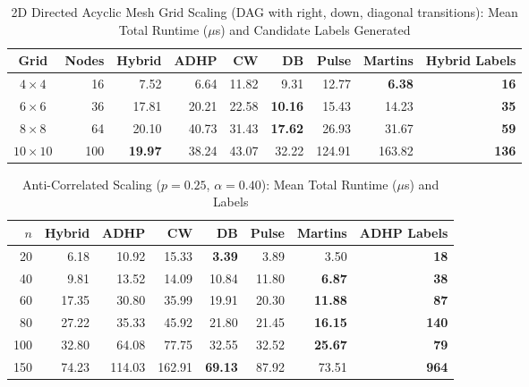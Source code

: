 \documentclass[11pt,a4paper]{article}
\begin{document}
\begin{table}[ht]
\centering
\small
\caption{2D Directed Acyclic Mesh Grid Scaling (DAG with right, down, diagonal transitions): Mean Total Runtime ($\mu$s) and Candidate Labels Generated}
\begin{tabular}{cr rrrrrr r}
\toprule
Grid & Nodes & \textbf{Hybrid} & ADHP & CW & DB & Pulse & Martins & \textbf{Hybrid Labels} \\
\midrule
$4 \times 4$   & 16  & 7.52 & 6.64 & 11.82 & 9.31 & 12.77 & \textbf{6.38} & \textbf{16} \\
$6 \times 6$   & 36  & 17.81 & 20.21 & 22.58 & \textbf{10.16} & 15.43 & 14.23 & \textbf{35} \\
$8 \times 8$   & 64  & 20.10 & 40.73 & 31.43 & \textbf{17.62} & 26.93 & 31.67 & \textbf{59} \\
$10 \times 10$   & 100  & \textbf{19.97} & 38.24 & 43.07 & 32.22 & 124.91 & 163.82 & \textbf{136} \\
\bottomrule
\end{tabular}
\end{table}

\begin{table}[ht]
\centering
\small
\caption{Anti-Correlated Scaling ($p=0.25$, $\alpha=0.40$): Mean Total Runtime ($\mu$s) and Labels}
\begin{tabular}{r rrrrrr r}
\toprule
$n$ & \textbf{Hybrid} & ADHP & CW & DB & Pulse & Martins & \textbf{ADHP Labels} \\
\midrule
20  & 6.18 & 10.92 & 15.33 & \textbf{3.39} & 3.89 & 3.50 & \textbf{18} \\
40  & 9.81 & 13.52 & 14.09 & 10.84 & 11.80 & \textbf{6.87} & \textbf{38} \\
60  & 17.35 & 30.80 & 35.99 & 19.91 & 20.30 & \textbf{11.88} & \textbf{87} \\
80  & 27.22 & 35.33 & 45.92 & 21.80 & 21.45 & \textbf{16.15} & \textbf{140} \\
100 & 32.80 & 64.08 & 77.75 & 32.55 & 32.52 & \textbf{25.67} & \textbf{79} \\
150 & 74.23 & 114.03 & 162.91 & \textbf{69.13} & 87.92 & 73.51 & \textbf{964} \\
\bottomrule
\end{tabular}
\end{table}
\end{document}
